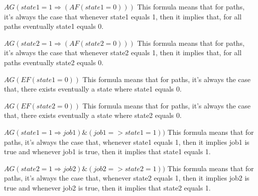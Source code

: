 $AG(state1=1 \Rightarrow (AF(state1=0)))$ \newline
This formula means that for paths, it's always the case that whenever state1 equals 1,
then it implies that, for all paths eventually state1 equals 0.

$AG(state2=1 \Rightarrow (AF(state2=0)))$ \newline
This formula means that for paths, it's always the case that whenever state2 equals 1,
then it implies that, for all paths eventually state2 equals 0.

$AG(EF(state1=0))$ \newline
This formula means that for paths, it's always the case that, there exists eventually
a state where state1 equals 0.

$AG(EF(state2=0))$ \newline
This formula means that for paths, it's always the case that, there exists eventually
a state where state2 equals 0.

$AG(state1=1 \Rightarrow job1) \& (job1=>state1=1))$ \newline
This formula means that for paths, it's always the case that, whenever state1 equals 1,
then it implies job1 is true and whenever job1 is true, then it implies that
state1 equals 1.

$AG(state2=1 \Rightarrow job2) \& (job2=>state2=1))$ \newline
This formula means that for paths, it's always the case that, whenever state2 equals 1,
then it implies job2 is true and whenever job2 is true, then it implies that
state2 equals 1.